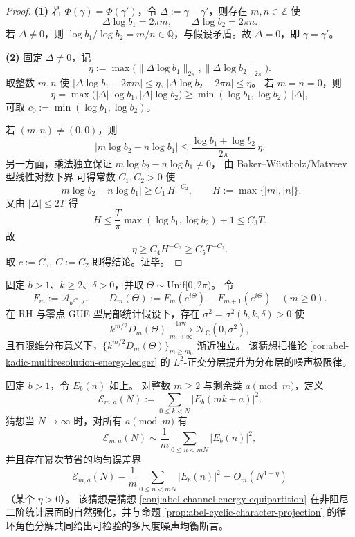 \begin{proof}
\textbf{(1)} 若 \(\Phi(\gamma)=\Phi(\gamma')\)，令 \(\Delta:=\gamma-\gamma'\)，则存在 \(m,n\in\mathbb Z\) 使
\[
\Delta\log b_1=2\pi m,\qquad \Delta\log b_2=2\pi n.
\]
若 \(\Delta\neq 0\)，则 \(\log b_1/\log b_2=m/n\in\mathbb Q\)，与假设矛盾。故 \(\Delta=0\)，即 \(\gamma=\gamma'\)。

\textbf{(2)} 固定 \(\Delta\neq 0\)，记
\[
\eta:=\max\!\bigl(\|\Delta\log b_1\|_{2\pi},\|\Delta\log b_2\|_{2\pi}\bigr).
\]
取整数 \(m,n\) 使
\(
|\Delta\log b_1-2\pi m|\le\eta
\),
\(
|\Delta\log b_2-2\pi n|\le\eta
\)。
若 \(m=n=0\)，则
\[
\eta=\max\!\bigl(|\Delta|\log b_1,|\Delta|\log b_2\bigr)\ge \min(\log b_1,\log b_2)\,|\Delta|,
\]
可取 \(c_0:=\min(\log b_1,\log b_2)\)。

若 \((m,n)\neq(0,0)\)，则
\[
\bigl|m\log b_2-n\log b_1\bigr|
\le \frac{\log b_1+\log b_2}{2\pi}\,\eta.
\]
另一方面，乘法独立保证
\(
m\log b_2-n\log b_1\neq 0
\)，
由 Baker--W\"ustholz/Matveev 型线性对数下界
\cite{BakerWustholz2007LogarithmicForms,Matveev2000LinearFormsLogs}
可得常数 \(C_1,C_2>0\) 使
\[
\bigl|m\log b_2-n\log b_1\bigr|
\ge C_1\,H^{-C_2},\qquad H:=\max\{|m|,|n|\}.
\]
又由 \(|\Delta|\le 2T\) 得
\[
H\le \frac{T}{\pi}\max(\log b_1,\log b_2)+1\le C_3T.
\]
故
\[
\eta\ge C_4H^{-C_2}\ge C_5T^{-C_2}.
\]
取 \(c:=C_5,\ C:=C_2\) 即得结论。证毕。
\end{proof}

\begin{conjecture}[尺度差分的渐近独立高斯性]\label{conj:abel-scale-difference-asymptotic-gaussianity}
固定 \(b>1\)、\(k\ge 2\)、\(\delta>0\)，并取 \(\Theta\sim\mathrm{Unif}[0,2\pi)\)。
令
\[
F_m:=\mathcal A_{b^{k^m},\delta},\qquad
D_m(\Theta):=F_m(e^{i\Theta})-F_{m+1}(e^{i\Theta})\quad(m\ge 0).
\]
在 RH 与零点 GUE 型局部统计假设下，存在 \(\sigma^2=\sigma^2(b,k,\delta)>0\) 使
\[
k^{m/2}D_m(\Theta)\xrightarrow[m\to\infty]{\mathrm{law}}\mathcal N_{\mathbb C}(0,\sigma^2),
\]
且有限维分布意义下，\(\{k^{m/2}D_m(\Theta)\}_{m\ge m_0}\) 渐近独立。
该猜想把推论 \ref{cor:abel-kadic-multiresolution-energy-ledger} 的 \(L^2\)-正交分层提升为分布层的噪声极限律。
\end{conjecture}

\begin{conjecture}[模同余能量均分律]\label{conj:abel-congruence-energy-equipartition}
固定 \(b>1\)，令 \(E_b(n)\) 如上。
对整数 \(m\ge 2\) 与剩余类 \(a\pmod m\)，定义
\[
\mathcal E_{m,a}(N):=\sum_{0\le k<N}|E_b(mk+a)|^2.
\]
猜想当 \(N\to\infty\) 时，对所有 \(a\pmod m\) 有
\[
\mathcal E_{m,a}(N)\sim
\frac1m\sum_{0\le n<mN}|E_b(n)|^2,
\]
并且存在幂次节省的均匀误差界
\[
\mathcal E_{m,a}(N)-\frac1m\sum_{0\le n<mN}|E_b(n)|^2
=O_m(N^{1-\eta})
\]
（某个 \(\eta>0\)）。
该猜想是猜想 \ref{conj:abel-channel-energy-equipartition} 在非阻尼二阶统计层面的自然强化，并与命题 \ref{prop:abel-cyclic-character-projection} 的循环角色分解共同给出可检验的多尺度噪声均衡断言。
\end{conjecture}

\endinput
